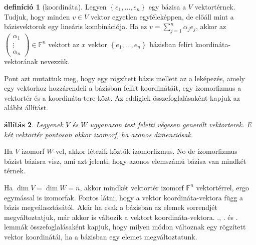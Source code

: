 \documentclass[9pt, a4paper, showtrims]{memoir}
\makeatletter
\let\Aref\relax
\renewenvironment{proof}[1][\proofname]
    {\par\pushQED{\qed}%
    \normalfont \topsep6\p@\@plus6\p@\relax
    \trivlist
    \item[\hskip\labelsep
        \itshape
    #1\@addpunct{:}]\ignorespaces}
    {\popQED\endtrivlist\@endpefalse}
\theoremstyle{plain}
\newtheorem{proposition}{állítás}[chapter]
\theoremstyle{remark}
\theoremstyle{definition}
\newtheorem{definition}[proposition]{definíció}
\makeatother
\begin{document}
\begin{definition}[koordináta]
    Legyen $\left\{ e_1,\dots,e_n \right\}$ egy bázisa a $V$ vektortérnek.
    Tudjuk, hogy minden $v\in V$ vektor egyetlen egyféleképpen, de előáll mint a bázisvektorok egy lineáris kombinációja.
    Ha ez $v=\sum_{j=1}^n\alpha_je_j$, akkor az 
    \begin{math}
        \begin{pmatrix}
            \alpha_1\\ \vdots\\ \alpha_n
        \end{pmatrix}
        \in
        \mathbb{F}^n
    \end{math}
    vektort az $x$ vektor $\left\{ e_1,\dots,e_n \right\}$ bázisban felírt koordináta-vektorának nevezzük.
\end{definition}
Pont azt mutattuk meg, hogy egy rögzített bázis mellett az a leképezés,
amely egy vektorhoz hozzárendeli a bázisban felírt koordinátáit, egy izomorfizmus
a vektortér és a koordináta-tere közt.
Az eddigiek összefoglalásaként kapjuk az alábbi állítást.
\begin{proposition}
    Legyenek $V$ és $W$ ugyanazon test feletti végesen generált vektorterek.
    E két vektortér pontosan akkor izomorf, ha azonos dimenziósak.
\end{proposition}
\begin{proof}
    Ha $V$ izomorf $W$-vel, akkor létezik köztük izomorfizmus.
    No de izomorfizmus bázist bázisra visz, ami azt jelenti, hogy azonos elemszámú
    bázisa van mindkét térnek.

    Ha $\dim V=\dim W=n$, akkor mindkét vektortér izomorf $\mathbb{F}^n$ vektortérrel,
    ergo egymással is izomorfak.
\end{proof}
Fontos látni, hogy a vektor koordináta-vektora függ a bázis megválasztásától.
Akár ha csak a bázisban az elemek sorrendjét megváltoztatjuk,
már akkor is változik a vektort koordináta-vektora.
\Aref{le:gencsere}., .  és . lemmák összefoglalásaként kapjuk,
hogy milyen módon változnak egy rögzített vektor koordinátái, 
ha a bázisban egy elemet megváltoztatunk.
\end{document}
